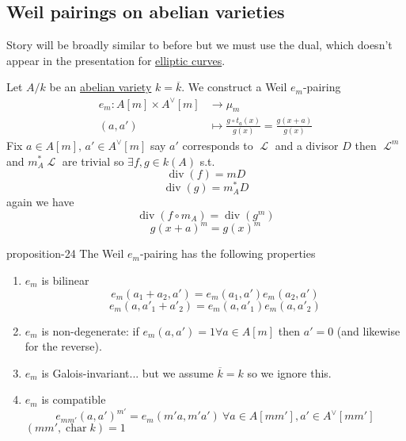 \documentclass[10pt,]{book}
\numberwithin{equation}{section}
\newcommand{\sheaf}[1]{\operatorname{\mathcal{#1}}}
\newcommand{\lb}{[}
\newcommand{\rb}{]}
\DeclareMathOperator{\divisor}{div}
\DeclareMathOperator{\characteristic}{char}
\newcommand{\amp}{&}
\begin{document}
\subsection[{Weil pairings on abelian varieties}]{Weil pairings on abelian varieties}\label{subsection-28}
\hypertarget{p-300}{}%
Story will be broadly similar to before but we must use the dual, which doesn't appear in the presentation for \hyperref[def-supersing-isog-ec]{elliptic curves}.%
\par
\hypertarget{p-301}{}%
Let \(A/k\) be an \hyperref[def-buntes-abvar]{abelian variety} \(k = \overline k\). We construct a Weil \(e_m\)-pairing%
\begin{align*}
e_m \colon A[m]\times A^\vee [m] \amp\to \mu_m\\
(a,a') \amp\mapsto \frac{g\circ t_a(x)}{g(x)} = \frac{g(x+a)}{g(x)}
\end{align*}
Fix \(a\in A\lb m\rb,\,a'\in A^\vee\lb m\rb\) say \(a'\) corresponds to \(\sheaf L\) and a divisor \(D\) then \(\sheaf L^m \) and \(m_A^* \sheaf L\) are trivial so \(\exists f,g \in k(A)\) s.t.%
\begin{equation*}
\divisor (f) = m D
\end{equation*}
%
\begin{equation*}
\divisor (g) = m_A^* D
\end{equation*}
again we have%
\begin{equation*}
\divisor( f\circ m_A) = \divisor (g^m)
\end{equation*}
%
\begin{equation*}
g(x+a)^m = g(x)^m
\end{equation*}
%
\begin{proposition}{}{}{proposition-24}%
\hypertarget{p-302}{}%
The Weil \(e_m\)-pairing has the following properties\leavevmode%
\begin{enumerate}
\item\hypertarget{li-44}{}\(e_m\) is bilinear%
\begin{equation*}
e_m(a_1+a_2,a') = e_m(a_1,a')e_m(a_2, a')
\end{equation*}
%
\begin{equation*}
e_m(a,a'_1+a'_2) = e_m(a,a'_1)e_m(a,a'_2)
\end{equation*}
%
\item\hypertarget{li-45}{}\(e_m\) is non-degenerate: if \(e_m(a,a') = 1 \forall a\in A\lb m\rb\) then \(a' = 0\) (and likewise for the reverse).%
\item\hypertarget{li-46}{}\(e_m\) is Galois-invariant... but we assume \(\overline k =k\) so we ignore this.%
\item\hypertarget{li-47}{}\(e_m\) is compatible%
\begin{equation*}
e_{mm'} (a,a')^{m'} = e_m(m'a, m'a') \ \forall a \in A[mm'], a'\in A^\vee [mm']
\end{equation*}
\((mm',\characteristic k) = 1\)%
\end{enumerate}
%
\end{proposition}
\end{document}
